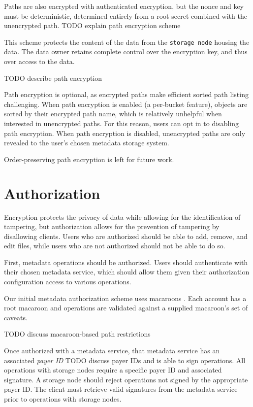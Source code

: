 \documentclass[11pt,fleqn,openany]{book}
\newcommand{\x}[1]{{\tt #1}} \newcommand{\code}[1]{{\tt #1}}
\newcommand{\todo}[1]{{\color{red} TODO #1 }}
\begin{document}
Paths are also encrypted with authenticated encryption, but the nonce and key
must be deterministic, determined entirely from a root secret combined with the
unencrypted path. \todo{explain path encryption scheme}

This scheme protects the
content of the data from the \x{storage node} housing the data. The data owner
retains complete control over the encryption key, and thus over access to the
data.

\todo{describe path encryption}

Path encryption is optional, as encrypted paths make efficient sorted path
listing challenging. When path encryption is enabled (a per-bucket feature),
objects are sorted by their encrypted path name, which is relatively unhelpful
when interested in unencrypted paths. For this reason, users can opt in to
disabling path encryption. When path encryption is disabled, unencrypted paths
are only revealed to the user's chosen metadata storage system.

Order-preserving path encryption is left for future work.

\section{Authorization}

Encryption protects the privacy of data while allowing for the identification
of tampering, but authorization allows for the prevention of tampering by
disallowing clients. Users who are authorized should be able to add, remove,
and edit files, while users who are not authorized should not be able to do so.

First, metadata operations should be authorized. Users should authenticate with
their chosen metadata service, which should allow them given their authorization
configuration access to various operations.

Our initial metadata authorization scheme uses macaroons \cite{macaroons}.
Each account has a root macaroon and operations are validated against a supplied
macaroon's set of caveats.

\todo{discuss macaroon-based path restrictions}

Once authorized with a metadata service, that metadata service has an associated
{\em payer ID} \todo{discuss payer IDs} and is able to sign operations. All
operations with storage nodes require a specific payer ID and associated
signature. A storage node should reject operations not signed by the appropriate
payer ID. The client must retrieve valid signatures from the metadata service
prior to operations with storage nodes.
\end{document}
